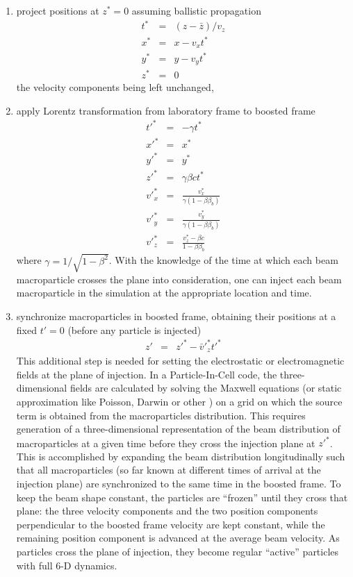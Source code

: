 \begin{enumerate}
\item project positions at $z^*=0$ assuming ballistic propagation
\begin{eqnarray}
    t^* &=& \left(z-\bar{z}\right)/v_z \label{Eq:t*}\\
    x^* &=& x-v_x t^* \label{Eq:x*}\\
    y^* &=& y-v_y t^* \label{Eq:y*}\\
    z^* &=& 0 \label{Eq:z*}
\end{eqnarray}
the velocity components being left unchanged,
\item apply Lorentz transformation from laboratory frame to boosted frame
\begin{eqnarray}
    t'^* &=& -\gamma t^* \label{Eq:tp*}\\
    x'^* &=& x^* \label{Eq:xp*}\\
    y'^* &=& y^* \label{Eq:yp*}\\
    z'^* &=& \gamma\beta c t^* \label{Eq:zp*}\\
    v'^*_x&=&\frac{v_x^*}{\gamma\left(1-\beta \beta_b\right)} \label{Eq:vxp*}\\
    v'^*_y&=&\frac{v_y^*}{\gamma\left(1-\beta \beta_b\right)} \label{Eq:vyp*}\\
    v'^*_z&=&\frac{v_z^*-\beta c}{1-\beta \beta_b} \label{Eq:vzp*}
\end{eqnarray}
where $\gamma=1/\sqrt{1-\beta^2}$. With the knowledge of the time at which each beam macroparticle crosses the plane into consideration, one can inject each beam macroparticle in the simulation at the appropriate location and time.

\item synchronize macroparticles in boosted frame, obtaining their positions at a fixed $t'=0$ (before any particle is injected)
\begin{eqnarray}
    z' &=& z'^*-\bar{v}'^*_z t'^* \label{Eq:zp}
\end{eqnarray}
    This additional step is needed for setting the electrostatic or electromagnetic fields at the plane of injection. In a Particle-In-Cell code, the three-dimensional fields are calculated by solving the Maxwell equations (or static approximation like Poisson, Darwin or other \cite{Vaypop2008}) on a grid on which the source term is obtained from the macroparticles distribution. This requires generation of a three-dimensional representation of the beam distribution of macroparticles at a given time before they cross the injection plane at $z'^*$. This is accomplished by expanding the beam distribution longitudinally such that all macroparticles (so far known at different times of arrival at the injection plane) are synchronized to the same time in the boosted frame. To keep the beam shape constant, the particles are ``frozen'' until they cross that plane: the three velocity components and the two position components perpendicular to the boosted frame velocity are kept constant, while the remaining position component is advanced at the average beam velocity. As particles cross the plane of injection, they become regular ``active'' particles with full 6-D dynamics.

\end{enumerate}

